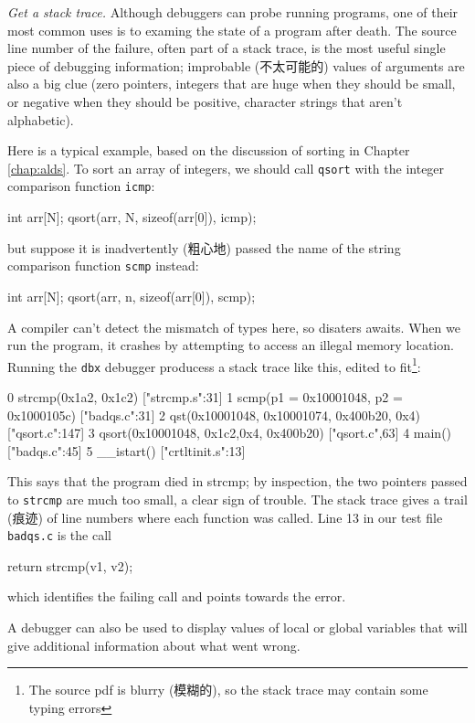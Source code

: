 \emph{Get a stack trace.} Although debuggers can probe running programs,
one of their most common uses is to examing the state of a program after
death. The source line number of the failure, often part of a stack trace,
is the most useful single piece of debugging information; improbable
(不太可能的) values of arguments are also a big clue (zero pointers,
integers that are huge when they should be small, or negative when they
should be positive, character strings that aren't alphabetic).

Here is a typical example, based on the discussion of sorting in Chapter
\ref{chap:alds}. To sort an array of integers, we should call \verb'qsort'
with the integer comparison function \verb'icmp':
\begin{wellcode}
    int arr[N];
    qsort(arr, N, sizeof(arr[0]), icmp);
\end{wellcode}
but suppose it is inadvertently (粗心地) passed the name of the string
comparison function \verb'scmp' instead:
\begin{badcode}
    int arr[N];
    qsort(arr, n, sizeof(arr[0]), scmp);
\end{badcode}
A compiler can't detect the mismatch of types here, so disaters awaits.
When we run the program, it crashes by attempting to access an illegal
memory location. Running the \verb'dbx' debugger producess a stack trace
like this, edited to fit\footnote{The source pdf is blurry (模糊的), so the
    stack trace may contain some typing errors}:
\begin{wellcode}
    0 strcmp(0x1a2, 0x1c2) ["strcmp.s":31]
    1 scmp(p1 = 0x10001048, p2 = 0x1000105c) ["badqs.c":31]
    2 qst(0x10001048, 0x10001074, 0x400b20, 0x4) ["qsort.c":147]
    3 qsort(0x10001048, 0x1c2,0x4, 0x400b20) ["qsort.c",63]
    4 main() ["badqs.c":45]
    5 __istart() ["crtltinit.s":13]
\end{wellcode}
This says that the program died in strcmp; by inspection, the two pointers
passed to \verb'strcmp' are much too small, a clear sign of trouble. The
stack trace gives a trail (痕迹) of line numbers where each function was
called. Line 13 in our test file \verb'badqs.c' is the call 
\begin{wellcode}
    return strcmp(v1, v2);
\end{wellcode}
which identifies the failing call and points towards the error.

A debugger can also be used to display values of local or global variables
that will give additional information about what went wrong.

